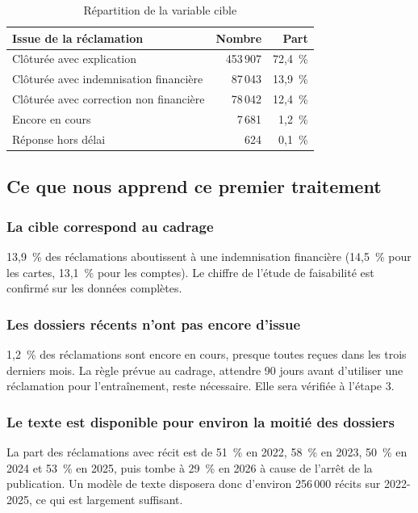 \documentclass[11pt,a4paper]{article}
\begin{document}
\begin{table}[H]
\centering\small
\begin{tabular}{@{}l r r@{}}
\toprule
Issue de la réclamation & Nombre & Part \\
\midrule
Clôturée avec explication & 453\,907 & 72,4~\% \\
Clôturée avec indemnisation financière & 87\,043 & 13,9~\% \\
Clôturée avec correction non financière & 78\,042 & 12,4~\% \\
Encore en cours & 7\,681 & 1,2~\% \\
Réponse hors délai & 624 & 0,1~\% \\
\bottomrule
\end{tabular}
\caption{Répartition de la variable cible}
\end{table}

\subsection{Ce que nous apprend ce premier traitement}

\subsubsection*{La cible correspond au cadrage}
13,9~\% des réclamations aboutissent à une indemnisation financière (14,5~\% pour les cartes, 13,1~\% pour les comptes). Le chiffre de l'étude de faisabilité est confirmé sur les données complètes.

\subsubsection*{Les dossiers récents n'ont pas encore d'issue}
1,2~\% des réclamations sont encore en cours, presque toutes reçues dans les trois derniers mois. La règle prévue au cadrage, attendre 90 jours avant d'utiliser une réclamation pour l'entraînement, reste nécessaire. Elle sera vérifiée à l'étape 3.

\subsubsection*{Le texte est disponible pour environ la moitié des dossiers}
La part des réclamations avec récit est de 51~\% en 2022, 58~\% en 2023, 50~\% en 2024 et 53~\% en 2025, puis tombe à 29~\% en 2026 à cause de l'arrêt de la publication. Un modèle de texte disposera donc d'environ 256\,000 récits sur 2022-2025, ce qui est largement suffisant.
\end{document}
